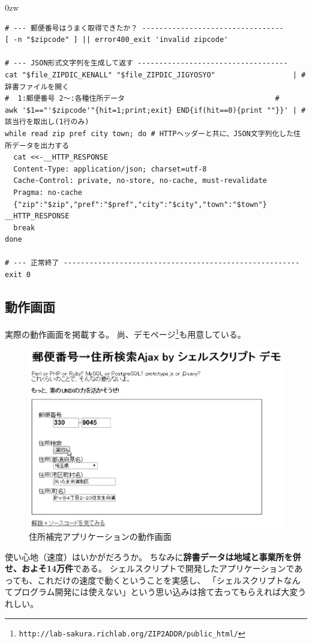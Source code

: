 \begin{indentation}{-9mm}{0zw}
\begin{verbatim}
# --- 郵便番号はうまく取得できたか？ ---------------------------------
[ -n "$zipcode" ] || error400_exit 'invalid zipcode'

# --- JSON形式文字列を生成して返す -----------------------------------
cat "$file_ZIPDIC_KENALL" "$file_ZIPDIC_JIGYOSYO"                  | # 辞書ファイルを開く
#  1:郵便番号 2～:各種住所データ                                   #
awk '$1=="'$zipcode'"{hit=1;print;exit} END{if(hit==0){print ""}}' | # 該当行を取出し(1行のみ)
while read zip pref city town; do # HTTPヘッダーと共に、JSON文字列化した住所データを出力する
  cat <<-__HTTP_RESPONSE
  Content-Type: application/json; charset=utf-8
  Cache-Control: private, no-store, no-cache, must-revalidate
  Pragma: no-cache
  {"zip":"$zip","pref":"$pref","city":"$city","town":"$town"}
__HTTP_RESPONSE
  break
done

# --- 正常終了 -------------------------------------------------------
exit 0
\end{verbatim}
\end{indentation}

\subsection*{動作画面}

実際の動作画面を掲載する。
尚、デモページ\footnote{\verb|http://lab-sakura.richlab.org/ZIP2ADDR/public_html/|}も用意している。

\begin{figure}[htb]
	\begin{center}
		\vspace{10mm}
		\includegraphics*[scale=0.60]{tex/6_cookingexample/figs/zip2addr_screenshot.eps}
		\vspace{0mm}
		\caption{住所補完アプリケーションの動作画面}
		\label{fig:metropiper_hanzomon}
		\vspace{0mm}
	\end{center}
\end{figure}

使い心地（速度）はいかがだろうか。
ちなみに\textbf{辞書データは地域と事業所を併せ、およそ14万件}である。
シェルスクリプトで開発したアプリケーションであっても、これだけの速度で動くということを実感し、
「シェルスクリプトなんてプログラム開発には使えない」という思い込みは捨て去ってもらえれば大変うれしい。
